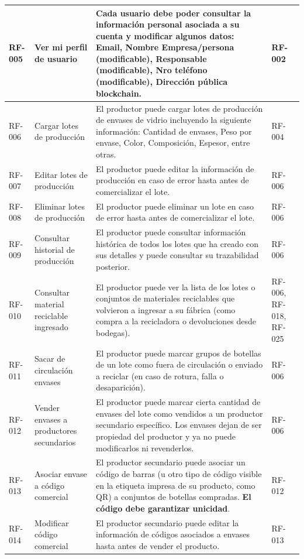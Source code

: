 \begin{xltabular}{\textwidth}{@{} L{1.3cm} L{2.5cm} Y L{1.5cm} @{}}
	\hline
	RF-005 & Ver mi perfil de usuario & Cada usuario debe poder consultar la información personal asociada a su cuenta y modificar algunos datos: Email, Nombre Empresa/persona (modificable), Responsable (modificable), Nro teléfono (modificable), Dirección pública blockchain. & RF-002 \\
	\hline
	RF-006 & Cargar lotes de producción & El productor puede cargar lotes de producción de envases de vidrio incluyendo la siguiente información: Cantidad de envases, Peso por envase, Color, Composición, Espesor, entre otras. & RF-004 \\
	\hline
	RF-007 & Editar lotes de producción & El productor puede editar la información de producción en caso de error hasta antes de comercializar el lote. & RF-006 \\
	\hline
	RF-008 & Eliminar lotes de producción & El productor puede eliminar un lote en caso de error hasta antes de comercializar el lote. & RF-006 \\
	\hline
	RF-009 & Consultar historial de producción & El productor puede consultar información histórica de todos los lotes que ha creado con sus detalles y puede consultar su \gls{trazabilidad} posterior. & RF-006 \\
	\hline
	RF-010 & Consultar material reciclable ingresado & El productor puede ver la lista de los lotes o conjuntos de materiales reciclables que volvieron a ingresar a su fábrica (como compra a la recicladora o devoluciones desde bodegas). & RF-006, RF-018, RF-025 \\
	\hline
	RF-011 & Sacar de circulación envases & El productor puede marcar grupos de botellas de un lote como fuera de circulación o enviado a reciclar (en caso de rotura, falla o desaparición). & RF-006 \\
	\hline
	RF-012 & Vender envases a productores secundarios & El productor puede marcar cierta cantidad de envases del lote como vendidos a un productor secundario específico. Los envases dejan de ser propiedad del productor y ya no puede modificarlos ni revenderlos. & RF-006 \\
	\hline
	RF-013 & Asociar envase a código comercial & El productor secundario puede asociar un código de barras (u otro tipo de código visible en la etiqueta impresa de su producto, como QR) a conjuntos de botellas compradas. \textbf{El código debe garantizar unicidad}. & RF-012 \\
	\hline
	RF-014 & Modificar código comercial & El productor secundario puede editar la información de códigos asociados a envases hasta antes de vender el producto. & RF-013 \\

\end{xltabular}
